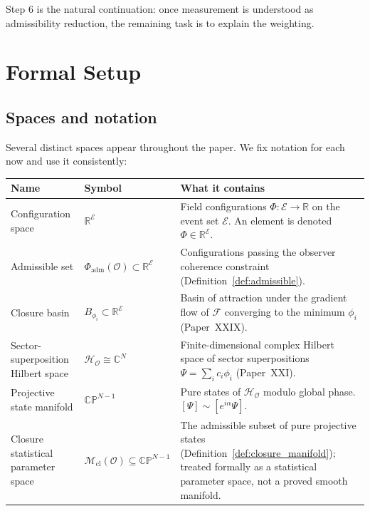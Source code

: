 \documentclass[12pt]{article}
\newcommand{\Ecal}{\mathcal{E}}
\newcommand{\Fcal}{\mathcal{F}}
\newcommand{\Ocal}{\mathcal{O}}
\newcommand{\Hcal}{\mathcal{H}}
\newcommand{\Mcl}{\mathcal{M}_{\mathrm{cl}}}
\begin{document}
Step 6 is the natural continuation: once measurement is understood as admissibility reduction, the remaining task is to explain the weighting.

\section{Formal Setup}\label{sec:setup}

\subsection{Spaces and notation}\label{subsec:notation}

Several distinct spaces appear throughout the paper. We fix notation for each now and use it consistently:

\begin{center}
\renewcommand{\arraystretch}{1.15}
\begin{tabular}{@{}p{}p{}p{}@{}}
\toprule
Name & Symbol & What it contains \\
\midrule
Configuration space & $\mathbb{R}^\Ecal$ & Field configurations $\Phi: \Ecal \to \mathbb{R}$ on the event set $\Ecal$. An element is denoted $\Phi \in \mathbb{R}^\Ecal$. \\
Admissible set & $\Phi_{\mathrm{adm}}(\Ocal) \subset \mathbb{R}^\Ecal$ & Configurations passing the observer coherence constraint (Definition~\ref{def:admissible}). \\
Closure basin & $B_{\phi_i} \subset \mathbb{R}^\Ecal$ & Basin of attraction under the gradient flow of $\Fcal$ converging to the minimum $\phi_i$ (Paper~XXIX). \\
Sector-superposition Hilbert space & $\Hcal_\Ocal \cong \mathbb{C}^N$ & Finite-dimensional complex Hilbert space of sector superpositions $\Psi = \sum_i c_i \phi_i$ (Paper~XXI). \\
Projective state manifold & $\mathbb{CP}^{N-1}$ & Pure states of $\Hcal_\Ocal$ modulo global phase. $[\Psi] \sim [e^{i\alpha}\Psi]$. \\
Closure statistical parameter space & $\Mcl(\Ocal) \subseteq \mathbb{CP}^{N-1}$ & The admissible subset of pure projective states (Definition~\ref{def:closure_manifold}); treated formally as a statistical parameter space, not a proved smooth manifold. \\
\bottomrule
\end{tabular}
\end{center}
\end{document}
